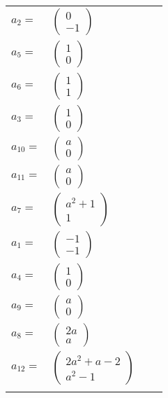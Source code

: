 \documentclass[1p]{elsarticle_modified}
\theoremstyle{definition}
\begin{document}
\begin{tabular}{m{7pt} m{180pt} m{7pt} m{180pt} }
\flushright $a_{2}=$&$\begin{pmatrix}0\\-1\end{pmatrix}$ \\
\flushright $a_{5}=$&$\begin{pmatrix}1\\0\end{pmatrix}$ \\
\flushright $a_{6}=$&$\begin{pmatrix}1\\1\end{pmatrix}$ \\
\flushright $a_{3}=$&$\begin{pmatrix}1\\0\end{pmatrix}$ \\
\flushright $a_{10}=$&$\begin{pmatrix}a\\0\end{pmatrix}$ \\
\flushright $a_{11}=$&$\begin{pmatrix}a\\0\end{pmatrix}$ \\
\flushright $a_{7}=$&$\begin{pmatrix}a^2+1\\1\end{pmatrix}$ \\
\flushright $a_{1}=$&$\begin{pmatrix}-1\\-1\end{pmatrix}$ \\
\flushright $a_{4}=$&$\begin{pmatrix}1\\0\end{pmatrix}$ \\
\flushright $a_{9}=$&$\begin{pmatrix}a\\0\end{pmatrix}$ \\
\flushright $a_{8}=$&$\begin{pmatrix}2 a\\a\end{pmatrix}$ \\
\flushright $a_{12}=$&$\begin{pmatrix}2 a^2+a-2\\a^2-1\end{pmatrix}$\\&\end{tabular}
\end{document}
